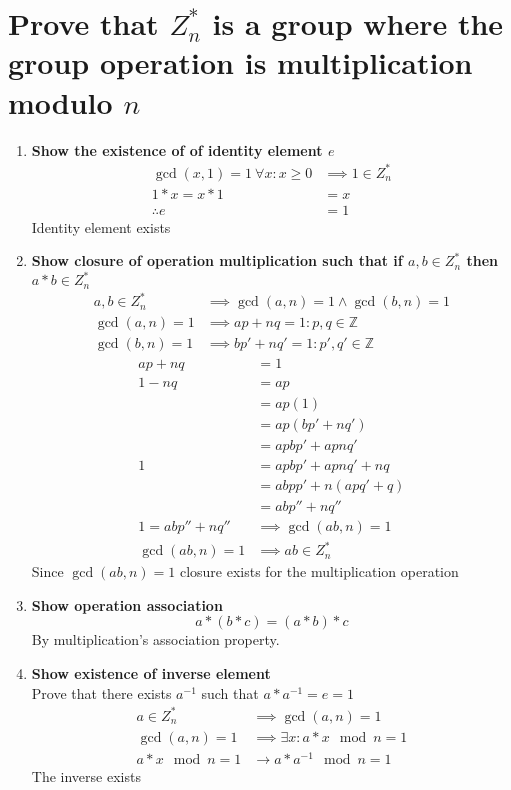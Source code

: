 \documentclass[letterpaper]{article}
\begin{document}
\section{Prove that $Z_n^*$ is a group where the group operation is multiplication modulo $n$}
\begin{enumerate}
	\item \textbf{Show the existence of of identity element $e$ }\\
		\begin{align*}
		\gcd(x,1) = 1\ \forall x: x\geq 0 &\implies 1\in Z_n^*\\
		1*x=x*1&=x\\
		\therefore e&=1
		\end{align*}
		Identity element exists
	\item \textbf{Show closure of operation multiplication such that if $a,b\in Z_n^*$ then $a*b \in Z_n^*$}\\
		\begin{align*}
		a,b\in Z_n^* &\implies \gcd(a,n)=1 \wedge \gcd(b,n) =1\\
		\gcd(a,n)=1 &\implies ap + nq = 1: p,q\in\mathbb{Z}\\
		\gcd(b,n) =1 &\implies bp' + nq' = 1: p',q'\in\mathbb{Z}
		\end{align*}
		\begin{align*}
		ap + nq &= 1\\
		1-nq &= ap \\
		&= ap(1) \\
		&= ap(bp'+nq')\\
		&= apbp'+apnq'\\
		1 &= apbp'+apnq' +nq\\
		&= abpp' + n(apq'+q)\\
		&= abp'' + nq''\\
		1 = abp'' + nq'' &\implies \gcd(ab,n)=1\\
		\gcd(ab,n)=1 &\implies ab \in Z_n^*
		\end{align*}
		Since $\gcd(ab,n)=1$ closure exists for the multiplication operation
		
	\item \textbf{Show operation association}
		\begin{equation*}
		a*(b*c)=(a*b)*c
		\end{equation*}
		By multiplication's association property.
		
	\item \textbf{Show existence of inverse element}\\
		Prove that there exists $a^{-1}$ such that $a*a^{-1} =e =1$
		\begin{align*}
		a \in Z_n^* &\implies \gcd(a,n)=1\\
		\gcd(a,n)=1 &\implies \exists x :a*x\mod n = 1\\
		a*x\mod n = 1 &\rightarrow a*a^{-1}\mod n = 1
		\end{align*}
		The inverse exists
\end{enumerate}
\end{document}
